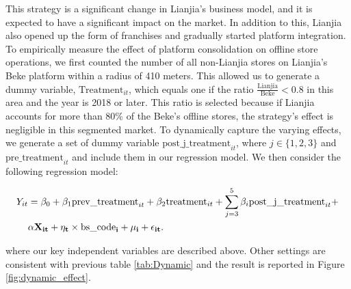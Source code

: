 \documentclass[11pt]{article}
\begin{document}
This strategy is a significant change in Lianjia's business model, and it is expected to have a significant impact on the market. In addition to this, Lianjia also opened up the form of franchises and gradually started platform integration. To empirically measure the effect of platform consolidation on offline store operations, we first counted the number of all non-Lianjia stores on Lianjia's Beke platform within a radius of 410 meters. This allowed us to generate a dummy variable, $\text{Treatment}_{it}$, which equals one if the ratio $\frac{\text{Lianjia}}{\text{Beke}} < 0.8$ in this area and the year is 2018 or later. This ratio is selected because if Lianjia accounts for more than 80\% of the Beke's offline stores, the strategy's effect is negligible in this segmented market. To dynamically capture the varying effects, we generate a set of dummy variable $\text{post\_j\_treatment}_{it}$, where $j \in \{1, 2, 3\}$ and $\text{pre\_treatment}_{it}$ and include them in our regression model. We then consider the following regression model:

\begin{equation}
  \begin{aligned}
    Y_{it} & = \beta_0 + \beta_1 \text{prev\_treatment}_{it} + \beta_2 \text{treatment}_{it} + \sum_{j=3}^5 \beta_{i} \text{post\_j\_treatment}_{it} + \\
           & \bf{\alpha} \bf{X}_{it} + \eta_{t} \times \text{bs\_code}_i + \mu_i + \epsilon_{it}. \label{eq:acn_assessment}
  \end{aligned}
\end{equation}

where our key independent variables are described above. Other settings are consistent with previous table \ref{tab:Dynamic} and the result is reported in Figure \ref{fig:dynamic_effect}.
\end{document}
